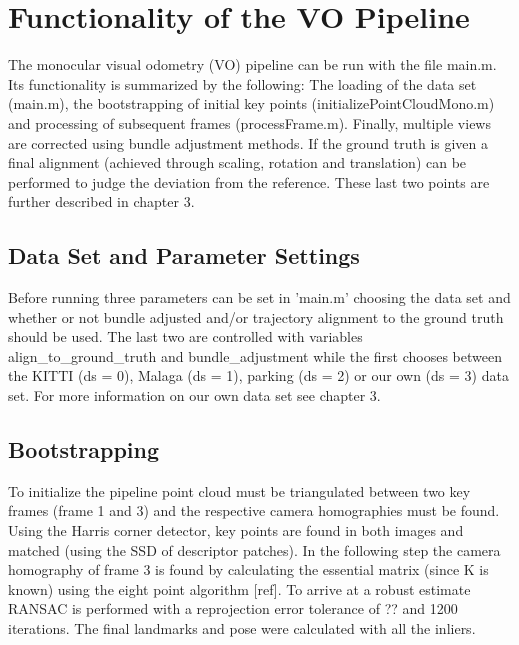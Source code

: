 \chapter{Functionality of the VO Pipeline}
The monocular visual odometry (VO) pipeline can be run with the file main.m. Its functionality is summarized by the following: The loading of the data set (main.m), the bootstrapping of initial key points (initializePointCloudMono.m) and processing of subsequent frames (processFrame.m). Finally, multiple views are corrected using bundle adjustment methods. If the ground truth is given a final alignment (achieved through scaling, rotation and translation) can be performed to judge the deviation from the reference. These last two points are further described in chapter 3.  

\section{Data Set and Parameter Settings}
Before running three parameters can be set in 'main.m' choosing the data set and whether or not bundle adjusted and/or trajectory alignment to the ground truth should be used. The last two are controlled with variables align\_to\_ground\_truth and bundle\_adjustment while the first chooses between the KITTI (ds = 0), Malaga (ds = 1), parking (ds = 2) or our own (ds = 3) data set. For more information on our own data set see chapter 3.

\section{Bootstrapping}
To initialize the pipeline point cloud must be triangulated between two key frames (frame 1 and 3) and the respective camera homographies must be found. Using the Harris corner detector, key points are found in both images and matched (using the SSD of descriptor patches). In the following step the camera homography of frame 3 is found by calculating the essential matrix (since K is known) using the eight point algorithm [ref]. To arrive at a robust estimate RANSAC is performed with a reprojection error tolerance of ?? and 1200 iterations. The final landmarks and pose were calculated with all the inliers.      

